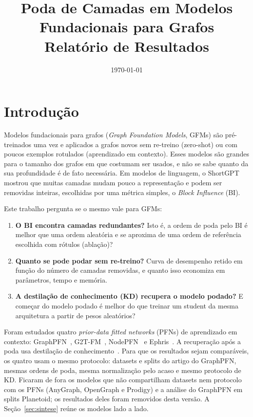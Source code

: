 \documentclass[12pt,a4paper]{article}
\title{Poda de Camadas em Modelos Fundacionais para Grafos\\
\large Relatório de Resultados}
\author{}
\date{\today}
\begin{document}
\maketitle
\tableofcontents
\newpage


\section{Introdução}

Modelos fundacionais para grafos (\emph{Graph Foundation Models}, GFMs) são pré-treinados uma vez e aplicados a grafos novos sem re-treino (zero-shot) ou com poucos exemplos rotulados (aprendizado em contexto). Esses modelos são grandes para o tamanho dos grafos em que costumam ser usados, e não se sabe quanto da sua profundidade é de fato necessária. Em modelos de linguagem, o ShortGPT~\cite{shortgpt} mostrou que muitas camadas mudam pouco a representação e podem ser removidas inteiras, escolhidas por uma métrica simples, o \emph{Block Influence} (BI).

Este trabalho pergunta se o mesmo vale para GFMs:
\begin{enumerate}
  \item \textbf{O BI encontra camadas redundantes?} Isto é, a ordem de poda pelo BI é melhor que uma ordem aleatória e se aproxima de uma ordem de referência escolhida com rótulos (ablação)?
  \item \textbf{Quanto se pode podar sem re-treino?} Curva de desempenho retido em função do número de camadas removidas, e quanto isso economiza em parâmetros, tempo e memória.
  \item \textbf{A destilação de conhecimento (KD) recupera o modelo podado?} E começar do modelo podado é melhor do que treinar um student da mesma arquitetura a partir de pesos aleatórios?
\end{enumerate}

Foram estudados quatro \emph{prior-data fitted networks} (PFNs) de aprendizado em contexto: GraphPFN~\cite{graphpfn}, G2T-FM~\cite{g2tfm}, NodePFN~\cite{nodepfn} e Ephris~\cite{ephris}. A recuperação após a poda usa destilação de conhecimento~\cite{hinton-kd}. Para que os resultados sejam comparáveis, os quatro usam o mesmo protocolo: datasets e splits do artigo do GraphPFN, mesmas ordens de poda, mesma normalização pelo acaso e mesmo protocolo de KD. Ficaram de fora os modelos que não compartilham datasets nem protocolo com os PFNs (AnyGraph, OpenGraph e Prodigy) e a análise do GraphPFN em splits Planetoid; os resultados deles foram removidos desta versão. A Seção~\ref{sec:sintese} reúne os modelos lado a lado.
\end{document}
